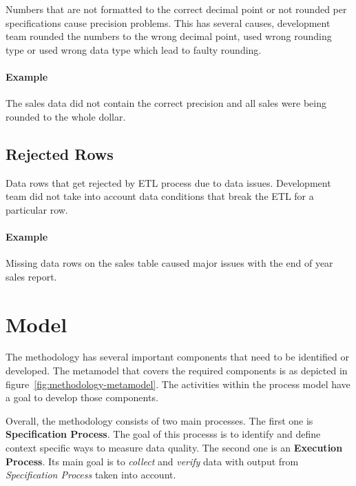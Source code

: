 Numbers that are not formatted to the correct decimal point or not rounded per specifications cause precision problems.
This has several causes, development team rounded the numbers to the wrong decimal point, used wrong rounding type or used wrong data type which lead to faulty rounding.

\paragraph*{Example} The sales data did not contain the correct precision and all sales were being rounded to the whole dollar.

\subsection*{Rejected Rows}

Data rows that get rejected by ETL process due to data issues.
Development team did not take into account data conditions that break the ETL for a particular row.

\paragraph*{Example} Missing data rows on the sales table caused major issues with the end of year sales report.


\section{Model}

The methodology has several important components that need to be identified or developed.
The metamodel that covers the required components is as depicted in figure~\ref{fig:methodology-metamodel}.
The activities within the process model have a goal to develop those components.

Overall, the methodology consists of two main processes.
The first one is \textbf{Specification Process}.
The goal of this processs is to identify and define context specific ways to measure data quality.
The second one is an \textbf{Execution Process}.
Its main goal is to \textit{collect} and \textit{verify} data with output from \textit{Specification Process} taken into account.

